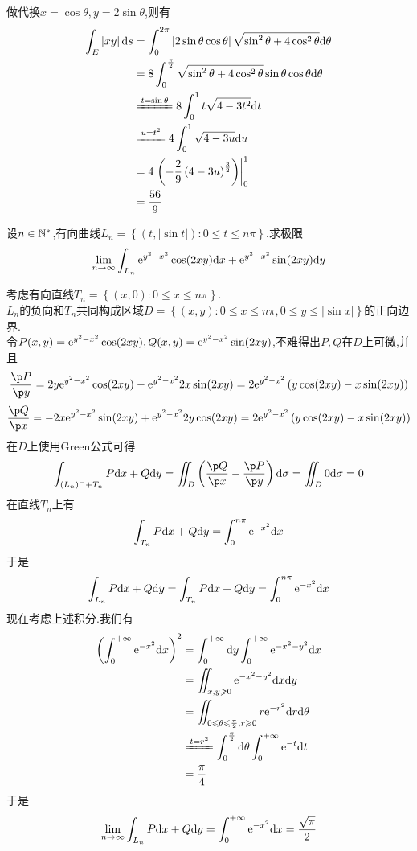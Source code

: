 \documentclass{ctexart}
\begin{document}
\begin{solution}
    做代换$x=\cos\theta,y=2\sin\theta$,则有
    \[\begin{aligned}
        \int_E\left|xy\right|\di s
        &= \int_0^{2\pi}\left|2\sin\theta\cos\theta\right|\sqrt{\sin^2\theta+4\cos^2\theta}\di\theta \\
        &= 8\int_0^{\frac\pi2}\sqrt{\sin^2\theta+4\cos^2\theta}\sin\theta\cos\theta\di\theta \\
        &\xlongequal{t=\sin\theta} 8\int_0^1t\sqrt{4-3t^2}\di t \\
        &\xlongequal{u=t^2} 4\int_0^1\sqrt{4-3u}\di u \\
        &= 4\left.\left(-\dfrac29\left(4-3u\right)^{\frac32}\right)\right|_0^1 \\
        &= \dfrac{56}{9}
    \end{aligned}\]
\end{solution}
\begin{problem}[4.(15\songti{分})]
    设$n\in\mathbb{N}^*$,有向曲线$L_n=\left\{\left(t,\left|\sin t\right|\right):0\leqslant t\leqslant n\pi\right\}$.求极限
    \[\lim_{n\to\infty}\int_{L_n}\mathrm{e}^{y^2-x^2}\cos(2xy)\mathrm{d} x+\mathrm{e}^{y^2-x^2}\sin(2xy)\mathrm{d} y\]

\end{problem}
\begin{solution}
    考虑有向直线$T_n=\left\{(x,0):0\leqslant x\leqslant n\pi\right\}$.\\
    $L_n$的负向和$T_n$共同构成区域$D=\left\{(x,y):0\leqslant x\leqslant n\pi,0\leqslant y\leqslant \left|\sin x\right|\right\}$的正向边界.\\
    令$P(x,y)=\mathrm{e}^{y^2-x^2}\cos(2xy),Q(x,y)=\mathrm{e}^{y^2-x^2}\sin(2xy)$,不难得出$P,Q$在$D$上可微,并且
    \[\dfrac{\p P}{\p y}=2y\e^{y^2-x^2}\cos(2xy)-\e^{y^2-x^2}2x\sin(2xy)=2\e^{y^2-x^2}\left(y\cos(2xy)-x\sin(2xy)\right)\]
    \[\dfrac{\p Q}{\p x}=-2x\e^{y^2-x^2}\sin(2xy)+\e^{y^2-x^2}2y\cos(2xy)=2\e^{y^2-x^2}\left(y\cos(2xy)-x\sin(2xy)\right)\]
    在$D$上使用Green公式可得
    \[\int_{\left(L_n\right)^-+T_n}P\di x+Q\di y
    =\iint_{D}\left(\dfrac{\p Q}{\p x}-\dfrac{\p P}{\p y}\right)\di\sigma
    =\iint_D0\di\sigma=0
    \]
    在直线$T_n$上有
    \[\int_{T_n}P\mathrm{d} x+Q\mathrm{d} y=\int_0^{n\pi}\mathrm{e}^{-x^2}\mathrm{d} x\]
    于是
    \[\int_{L_n}P\mathrm{d} x+Q\mathrm{d} y=\int_{T_n}P\mathrm{d} x+Q\mathrm{d} y=\int_0^{n\pi}\mathrm{e}^{-x^2}\mathrm{d} x\]
    现在考虑上述积分.我们有
    \[\begin{aligned}
        \left(\int_{0}^{+\infty}\e^{-x^2}\di x\right)^2
        &= \int_0^{+\infty}\di y\int_0^{+\infty}\e^{-x^2-y^2}\di x \\
        &= \iint_{x,y\geqslant 0}\e^{-x^2-y^2}\di x\di y \\
        &= \iint_{0\leqslant\theta\leqslant\frac\pi2,r\geqslant 0}r\e^{-r^2}\di r\di \theta\\
        &\xlongequal{t=r^2} \int_0^{\frac\pi2}\di\theta\int_0^{+\infty}\e^{-t}\di t \\
        &= \dfrac{\pi}{4}
    \end{aligned}\]
    于是
    \[\lim_{n\to\infty}\int_{L_n}P\mathrm{d} x+Q\mathrm{d} y=\int_0^{+\infty}\mathrm{e}^{-x^2}\mathrm{d} x=\dfrac{\sqrt\pi}{2}\]

\end{solution}
\end{document}
